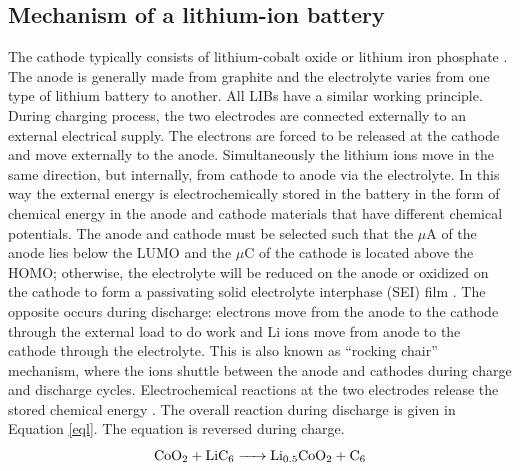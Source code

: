 \subsection*{Mechanism of a lithium-ion battery}
The cathode typically consists of lithium-cobalt oxide  or lithium iron phosphate . The anode is generally made from graphite and the electrolyte varies from one type of lithium battery to another. All LIBs have a similar working principle. During charging process, the two electrodes are connected externally to an external electrical supply. The electrons are forced to be released at the cathode and move externally to the anode. Simultaneously the lithium ions move in the same direction, but internally, from cathode to anode via the electrolyte. In this way the external energy is electrochemically stored in the battery in the form of chemical energy in the anode and cathode materials that have different chemical potentials. The anode and cathode must be selected such that the $\mu$A of the anode lies below the LUMO and the $\mu$C of the cathode is located above the HOMO; otherwise, the electrolyte will be reduced on the anode or oxidized on the cathode to form a passivating solid electrolyte interphase (SEI) film \cite{goodenough_challenges_2010}. The opposite occurs during discharge: electrons move from the anode to the cathode through the external load to do work and Li ions move from anode to the cathode through the electrolyte. This is also known as \enquote{rocking chair} mechanism, where the  ions shuttle between the anode and cathodes during charge and discharge cycles. Electrochemical reactions at the two electrodes release the stored chemical energy \cite{deng_li-ion_2015}. The overall reaction during discharge is given in Equation \ref{eql}. The equation is reversed during charge. 
\begin{equation}\label{eql}
    \ce{CoO2 + LiC6 -> Li_{0.5}CoO2 + C6}
\end{equation}

